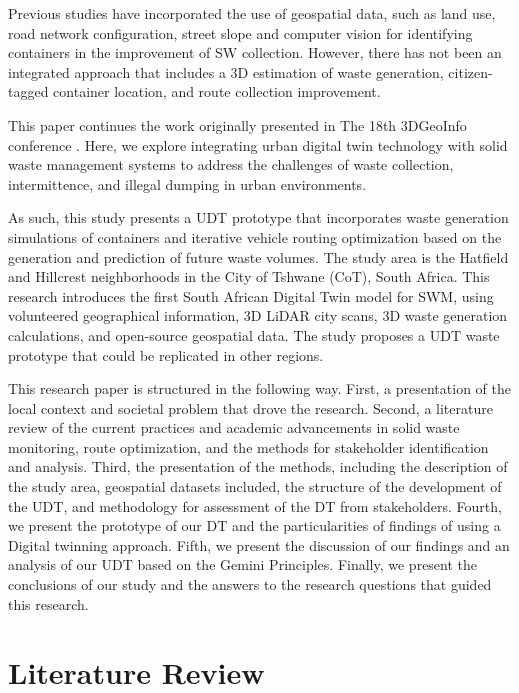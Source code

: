 \documentclass[authoryear,preprint,review,doubleblind, 12pt]{elsarticle}
\begin{document}
    Previous studies have incorporated the use of geospatial data, such as land use, road network configuration, street slope \citep{Hina2020, Sahib2021, Malakahmad2014} and computer vision for identifying containers  \citep{Moral2022} in the improvement of SW collection. However, there has not been an integrated approach that includes a 3D estimation of waste generation, citizen-tagged container location, and route collection improvement.

    This paper continues the work originally presented in The 18th 3DGeoInfo conference \citep{cardenasivanSolidWasteVirtual24}. Here, we explore integrating urban digital twin technology with solid waste management systems to address the challenges of waste collection, intermittence, and illegal dumping in urban environments.
    
    As such, this study presents a UDT prototype that incorporates waste generation simulations of containers and iterative vehicle routing optimization based on the generation and prediction of future waste volumes. The study area is the Hatfield and Hillcrest neighborhoods in the City of Tshwane (CoT), South Africa. This research introduces the first South African Digital Twin model for SWM, using volunteered geographical information, 3D LiDAR city scans, 3D waste generation calculations, and open-source geospatial data. The study proposes a UDT waste prototype that could be replicated in other regions.

    This research paper is structured in the following way. First, a presentation of the local context and societal problem that drove the research. Second, a literature review of the current practices and academic advancements in solid waste monitoring, route optimization, and the methods for stakeholder identification and analysis. Third, the presentation of the methods, including the description of the study area, geospatial datasets included, the structure of the development of the UDT, and methodology for assessment of the DT from stakeholders. Fourth, we present the prototype of our DT and the particularities of findings of using a Digital twinning approach. Fifth, we present the discussion of our findings and an analysis of our UDT based on the Gemini Principles. Finally, we present the conclusions of our study and the answers to the research questions that guided this research.

    \section{Literature Review}
    \label{subsec:Background}
\end{document}
